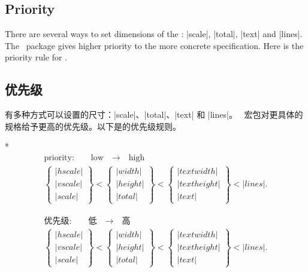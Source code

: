 
\begin{paracol}{2}
\subsection{Priority}\label{sec:priority}

There are several ways to set dimensions of the :
|scale|, |total|, |text| and |lines|. The \Gm\ package gives higher
priority to the more concrete specification. Here is the priority
rule for .

\switchcolumn
\subsection{优先级}

有多种方式可以设置的尺寸：|scale|、|total|、|text| 和 |lines|。
\Gm\ 宏包对更具体的规格给予更高的优先级。以下是的优先级规则。

\switchcolumn[0]*
 \[\begin{array}{c}
 \textrm{priority:}\qquad\textrm{low}\quad
    \longrightarrow\quad\textrm{high}\\[1em]
 \left\{\begin{array}{l}|hscale|\\|vscale|\\|scale|
        \end{array}\right\} <
 \left\{\begin{array}{l}|width|\\|height|\\|total|
        \end{array}\right\} <
 \left\{\begin{array}{l}|textwidth|\\|textheight|
         \\|text|\end{array}\right\} < |lines|.
 \end{array}\]

\switchcolumn
 \[\begin{array}{c}
 \textrm{优先级:}\qquad\textrm{低}\quad
    \longrightarrow\quad\textrm{高}\\[1em]
 \left\{\begin{array}{l}|hscale|\\|vscale|\\|scale|
        \end{array}\right\} <
 \left\{\begin{array}{l}|width|\\|height|\\|total|
        \end{array}\right\} <
 \left\{\begin{array}{l}|textwidth|\\|textheight|
         \\|text|\end{array}\right\} < |lines|.
 \end{array}\]



\end{paracol}
